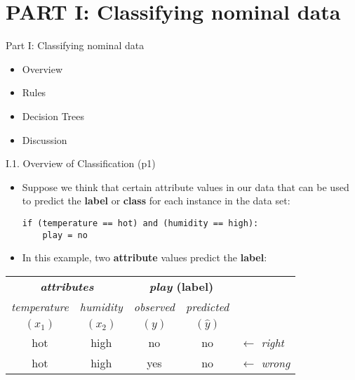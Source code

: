 \documentclass[handout]{beamer}
\newcommand{\strong}[1]{\textbf{\color{teal} #1}}
\newcommand{\stronger}[1]{\textbf{\color{purple} #1}}
\begin{document}
\section{PART I: Classifying nominal data}
\begin{frame}{Part I: Classifying nominal data}
\begin{itemize}
\item[I.1.] Overview
\item[I.2.] Rules
\item[I.3.] Decision Trees
\item[I.4.] Discussion
\end{itemize}
\end{frame}
\begin{frame}[fragile]{I.1. Overview of Classification (p1)}
\begin{itemize}
\item Suppose we think that certain attribute values in our data that can be used to predict the \stronger{label} or \stronger{class} for each instance in the data set:
\begin{lstlisting}[numbers=none]
if (temperature == hot) and (humidity == high):
	play = no
\end{lstlisting}
\item In this example, two \strong{attribute} values predict the \strong{label}:
\end{itemize}
\begin{center}
\begin{tabular}{|c|c||c|c|l}
\multicolumn{2}{|c||}{\strong{\emph{attributes}}}
                                     & \multicolumn{2}{|c|}{\strong{\emph{play} (label)}} \\
\emph{temperature} & \emph{humidity} & \emph{observed} & \emph{predicted} \\
$(x_1)$            & $(x_2)$         & $(y)$           & $(\hat{y})$ \\
\cline{1-4}
hot & high & no  & {\color{blue}no} & $\leftarrow$ \emph{right}\\
hot & high & yes & {\color{blue}no} & $\leftarrow$ \emph{wrong}\\
\cline{1-4}
\end{tabular}
\end{center}
\end{frame}
\end{document}

